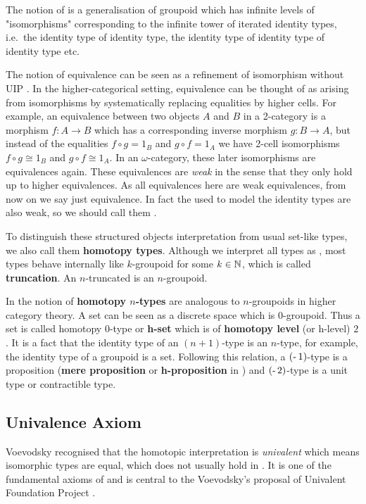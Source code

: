The notion of \ogs is a generalisation of groupoid which has infinite levels of "isomorphisms" corresponding to the infinite tower of iterated identity types, i.e.\ the identity type of identity type, the identity type of identity type of identity type etc.

The notion of equivalence can be seen as a refinement of isomorphism without UIP \cite{txa:csl}. 
In the higher-categorical setting, equivalence can be thought of as arising from isomorphisms by systematically replacing equalities by higher cells.
For example, an equivalence 
between two objects $A$ and $B$ in a 2-category is a morphism $f : A \rightarrow B$ which has a
corresponding inverse morphism $ g : B \rightarrow A$, but instead of the
equalities $f ∘ g = 1_B$ and $g ∘ f = 1_A$ we have 2-cell isomorphisms $f ∘ g ≅ 1_B$ and $g ∘ f ≅ 1_A$. In an $\omega$-category, these later isomorphisms are equivalences again.
These equivalences are \emph{weak} in the sense that they only hold up to higher equivalences. 
As all equivalences here are weak equivalences, from now on we say just equivalence.
In fact the \og used to model the identity types are also weak, so we should call them \textbf{\wog}.



To distinguish these structured objects interpretation from usual set-like types, we also call them \textbf{homotopy types}. Although we interpret all types as \og, most types behave internally like $k$-groupoid for some $k \in \mathbb{N}$, which is called \textbf{truncation}. An $n$-truncated \ogs is an $n$-groupoid.

In \hott the notion of \textbf{homotopy $n$-types} are analogous to $n$-groupoids in higher category theory. A set can be seen as a discrete space which is $0$-groupoid. Thus a set is called homotopy $0$-type or \textbf{h-set} which is of \textbf{homotopy level} (or h-level) $2$. It is a fact that the identity type of an $(n+1)$-type is an $n$-type, for example, the identity type of a groupoid is a set. Following this relation, a $(\operatorname{\text{-}} 1)$-type is a proposition (\textbf{mere proposition} or \textbf{h-proposition} in \hott) and $(\operatorname{\text{-}} 2)$-type is a unit type or contractible type.

\subsection{Univalence Axiom}

Voevodsky recognised that the homotopic interpretation is \emph{univalent} which means isomorphic types are equal, which does not usually hold in \itt. 
It is one of the fundamental axioms of \hott and is central to the Voevodsky's proposal of Univalent Foundation Project \cite{vv_uf}. 

